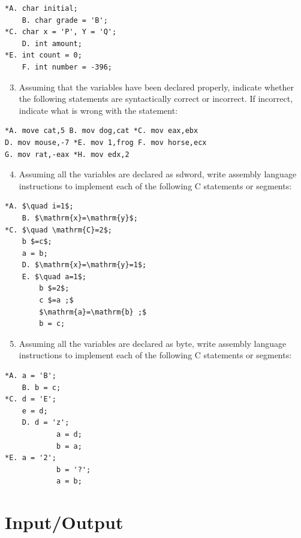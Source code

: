 \documentclass[10pt]{book}
\begin{document}
\begin{verbatim}
*A. char initial;
    B. char grade = 'B';
*C. char x = 'P', Y = 'Q';
    D. int amount;
*E. int count = 0;
    F. int number = -396;
\end{verbatim}

\begin{enumerate}
  \setcounter{enumi}{2}
  \item Assuming that the variables have been declared properly, indicate whether the following statements are syntactically correct or incorrect. If incorrect, indicate what is wrong with the statement:
\end{enumerate}

\begin{verbatim}
*A. move cat,5 B. mov dog,cat *C. mov eax,ebx
D. mov mouse,-7 *E. mov 1,frog F. mov horse,ecx
G. mov rat,-eax *H. mov edx,2
\end{verbatim}

\begin{enumerate}
  \setcounter{enumi}{3}
  \item Assuming all the variables are declared as sdword, write assembly language instructions to implement each of the following C statements or segments:
\end{enumerate}


\begin{verbatim}
*A. $\quad i=1$;
    B. $\mathrm{x}=\mathrm{y}$;
*C. $\quad \mathrm{C}=2$;
    b $=c$;
    a = b;
    D. $\mathrm{x}=\mathrm{y}=1$;
    E. $\quad a=1$;
        b $=2$;
        c $=a ;$
        $\mathrm{a}=\mathrm{b} ;$
        b = c;
\end{verbatim}

\begin{enumerate}
  \setcounter{enumi}{4}
  \item Assuming all the variables are declared as byte, write assembly language instructions to implement each of the following C statements or segments:
\end{enumerate}

\begin{verbatim}
*A. a = 'B';
    B. b = c;
*C. d = 'E';
    e = d;
    D. d = 'z';
            a = d;
            b = a;
*E. a = '2';
            b = '?';
            a = b;
\end{verbatim}

\section*{Input/Output}
\end{document}
